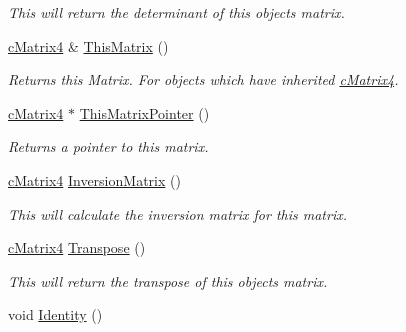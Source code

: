 \begin{DoxyCompactItemize}
\begin{DoxyCompactList}\small\item\em This will return the determinant of this objects matrix. \end{DoxyCompactList}\item 
\hypertarget{classc_matrix4_ac39fd297327a7103ff26e227bec5295e}{
\hyperlink{classc_matrix4}{cMatrix4} \& \hyperlink{classc_matrix4_ac39fd297327a7103ff26e227bec5295e}{ThisMatrix} ()}
\label{classc_matrix4_ac39fd297327a7103ff26e227bec5295e}

\begin{DoxyCompactList}\small\item\em Returns this Matrix. For objects which have inherited \hyperlink{classc_matrix4}{cMatrix4}. \end{DoxyCompactList}\item 
\hypertarget{classc_matrix4_a5b57ac77fee2c235af694060361f84d2}{
\hyperlink{classc_matrix4}{cMatrix4} $\ast$ \hyperlink{classc_matrix4_a5b57ac77fee2c235af694060361f84d2}{ThisMatrixPointer} ()}
\label{classc_matrix4_a5b57ac77fee2c235af694060361f84d2}

\begin{DoxyCompactList}\small\item\em Returns a pointer to this matrix. \end{DoxyCompactList}\item 
\hypertarget{classc_matrix4_a88d1247e71bb96965a0e847a7a72e2dc}{
\hyperlink{classc_matrix4}{cMatrix4} \hyperlink{classc_matrix4_a88d1247e71bb96965a0e847a7a72e2dc}{InversionMatrix} ()}
\label{classc_matrix4_a88d1247e71bb96965a0e847a7a72e2dc}

\begin{DoxyCompactList}\small\item\em This will calculate the inversion matrix for this matrix. \end{DoxyCompactList}\item 
\hypertarget{classc_matrix4_ac8b6f1a9352943cd86ef4c088c438307}{
\hyperlink{classc_matrix4}{cMatrix4} \hyperlink{classc_matrix4_ac8b6f1a9352943cd86ef4c088c438307}{Transpose} ()}
\label{classc_matrix4_ac8b6f1a9352943cd86ef4c088c438307}

\begin{DoxyCompactList}\small\item\em This will return the transpose of this objects matrix. \end{DoxyCompactList}\item 
\hypertarget{classc_matrix4_a6aa4f58a001499cd666f9d65f3a821a0}{
void \hyperlink{classc_matrix4_a6aa4f58a001499cd666f9d65f3a821a0}{Identity} ()}
\label{classc_matrix4_a6aa4f58a001499cd666f9d65f3a821a0}


\end{DoxyCompactItemize}
